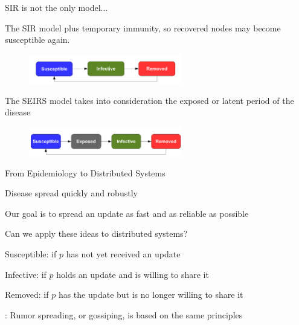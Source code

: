 \begin{frame}{SIR is not the only model...}
		\begin{definition}
			The SIR model plus temporary immunity, so recovered nodes may
			become susceptible again.	
		\end{definition}
		\begin{figure}
			\includegraphics[width=0.6\textwidth]{model-sirs}
		\end{figure}
		\begin{definition}
			The SEIRS model takes into consideration the \alert{exposed} or 
			latent period of the disease
		\end{definition}
		\begin{figure}
			\includegraphics[width=0.6\textwidth]{model-seirs}
		\end{figure}
\end{frame}

\begin{frame}{From Epidemiology to Distributed Systems}


\BI
\item Disease spread quickly and robustly
\item Our goal is to spread an update as fast and as reliable as possible
\item Can we apply these ideas to distributed systems?
\EI

\bigskip
\begin{definition}
\BI
\item \alert{Susceptible}:	if $p$ has not yet received an update
\item \alert{Infective}:		if $p$ holds an update and is willing to share it
\item \alert{Removed}:	if $p$ has the update but is no longer willing to share it
\EI

\end{definition}

\bigskip
{}: Rumor spreading, or gossiping, is based on the same principles


\end{frame}



